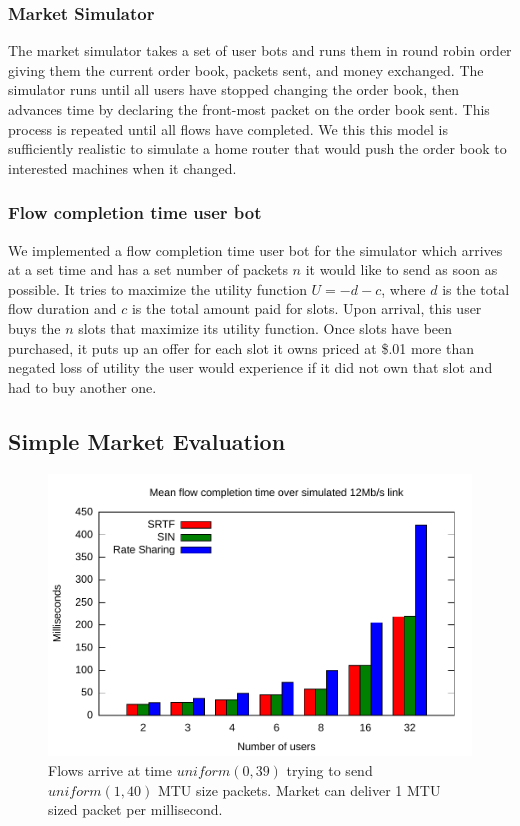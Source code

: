 \subsubsection{Market Simulator}
The market simulator takes a set of user bots and runs them in round robin order giving them the current order book, packets sent, and money exchanged. The simulator runs until all users have stopped changing the order book, then advances time by declaring the front-most packet on the order book sent. This process is repeated until all flows have completed. We this this model is sufficiently realistic to simulate a home router that would push the order book to interested machines when it changed.

\subsubsection{Flow completion time user bot}
We implemented a flow completion time user bot for the simulator which arrives at a set time and has a set number of packets $n$ it would like to send as soon as possible. It tries to maximize the utility function $U= -d - c$, where $d$ is the total flow duration and $c$ is the total amount paid for slots.
Upon arrival, this user buys the $n$ slots that maximize its utility function. Once slots have been purchased, it puts up an offer for each slot it owns priced at \$.01 more than negated loss of utility the user would experience if it did not own that slot and had to buy another one.

\subsection{Simple Market Evaluation}
\begin{figure}
\includegraphics[width=\columnwidth]{plots/delay_over_srtf.pdf}
\caption{Flows arrive at time $uniform(0, 39)$ trying to send $uniform(1, 40)$ MTU size packets. Market can deliver 1 MTU sized packet per millisecond.}
\label{f:delay_over_srtf}
\end{figure}

